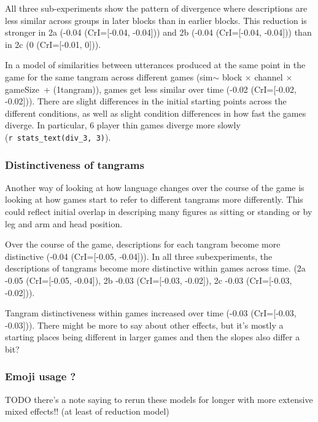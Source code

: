 \documentclass[
  english,
  a4paper,
]{article}
\begin{document}
All three sub-experiments show the pattern of divergence where descriptions are less similar across groups in later blocks than in earlier blocks. This reduction is stronger in 2a (-0.04 (CrI={[}-0.04, -0.04{]})) and 2b (-0.04 (CrI={[}-0.04, -0.04{]})) than in 2c (0 (CrI={[}-0.01, 0{]})).

In a model of similarities between utterances produced at the same point in the game for the same tangram across different games (sim\(\sim\) block \(\times\) channel \(\times\) gameSize~+ (1\textbar tangram)), games get less similar over time (-0.02 (CrI={[}-0.02, -0.02{]})). There are slight differences in the initial starting points across the different conditions, as well as slight condition differences in how fast the games diverge. In particular, 6 player thin games diverge more slowly (\texttt{r\ stats\_text(div\_3,\ 3)}).

\hypertarget{distinctiveness-of-tangrams}{%
\subsubsection{Distinctiveness of tangrams}\label{distinctiveness-of-tangrams}}

Another way of looking at how language changes over the course of the game is looking at how games start to refer to different tangrams more differently. This could reflect initial overlap in descriping many figures as sitting or standing or by leg and arm and head position.

Over the course of the game, descriptions for each tangram become more distinctive (-0.04 (CrI={[}-0.05, -0.04{]})).
In all three subexperiments, the descriptions of tangrams become more distinctive within games across time. (2a -0.05 (CrI={[}-0.05, -0.04{]}), 2b -0.03 (CrI={[}-0.03, -0.02{]}), 2c -0.03 (CrI={[}-0.03, -0.02{]})).

Tangram distinctiveness within games increased over time (-0.03 (CrI={[}-0.03, -0.03{]})). There might be more to say about other effects, but it's mostly a starting places being different in larger games and then the slopes also differ a bit?

\hypertarget{emoji-usage}{%
\subsubsection{Emoji usage ?}\label{emoji-usage}}

TODO there's a note saying to rerun these models for longer with more extensive mixed effects!! (at least of reduction model)
\end{document}
